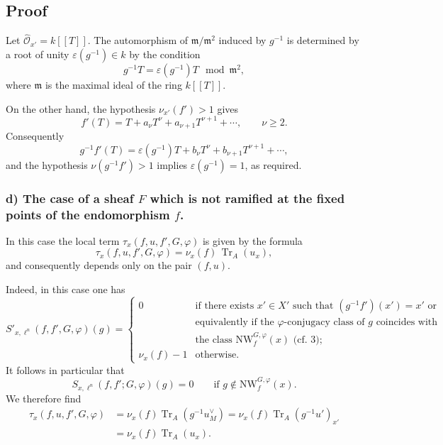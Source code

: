 \documentclass[11pt]{article}
\providecommand{\fm}{\mathfrak{m}}
\providecommand{\Tr}{\operatorname{Tr}}
\providecommand{\Tr}{\operatorname{Tr}}
\providecommand{\Tr}{\operatorname{Tr}}
\providecommand{\Tr}{\operatorname{Tr}}
\providecommand{\fm}{\mathfrak m}
\providecommand{\Tr}{\operatorname{Tr}}
\begin{document}
\subsection*{Proof}
Let $\widehat{\mathcal O}_{x'}=k[[T]]$. The automorphism of $\fm/\fm^2$ induced by $g^{-1}$ is determined by a root of unity $\varepsilon(g^{-1})\in k$ by the condition
\[
g^{-1}T=\varepsilon(g^{-1})T\mod \fm^2,
\]
where $\fm$ is the maximal ideal of the ring $k[[T]]$.

On the other hand, the hypothesis $\nu_{x'}(f')>1$ gives
\[
f'(T)=T+a_\nu T^\nu+a_{\nu+1}T^{\nu+1}+\cdots,
\qquad \nu\ge2.
\]
Consequently
\[
g^{-1}f'(T)=\varepsilon(g^{-1})T+b_\nu T^\nu+b_{\nu+1}T^{\nu+1}+\cdots,
\]
and the hypothesis $\nu(g^{-1}f')>1$ implies $\varepsilon(g^{-1})=1$, as required.

\subsubsection*{d) The case of a sheaf $F$ which is not ramified at the fixed points of the endomorphism $f$.}
In this case the local term $\tau_x(f,u,f',G,\varphi)$ is given by the formula
\begin{equation}\tag{6.4.6}\label{sga5:XII:equation:6.4.6}
\tau_x(f,u,f',G,\varphi)=\nu_x(f)\,\Tr_A(u_x),
\end{equation}
and consequently depends only on the pair $(f,u)$.

Indeed, in this case one has
\begin{equation}\tag{6.4.7}\label{sga5:XII:equation:6.4.7}
S'_{x,\ell^n}(f,f',G,\varphi)(g)=
\begin{cases}
0&\text{if there exists }x'\in X'\text{ such that }(g^{-1}f')(x')=x'\text{ or}\\
&\text{equivalently if the $\varphi$-conjugacy class of $g$ coincides with}\\
&\text{the class }\mathrm{NW}_{f}^{G,\varphi}(x)\text{ (cf. 3); }\\
\nu_x(f)-1&\text{otherwise.}
\end{cases}
\end{equation}
It follows in particular that
\begin{equation}\tag{6.4.8}\label{sga5:XII:equation:6.4.8}
S_{x,\ell^n}(f,f';G,\varphi)(g)=0
\qquad \text{if } g\notin \mathrm{NW}_{f}^{G,\varphi}(x).
\end{equation}
We therefore find
\begin{equation}\tag{6.4.9}\label{sga5:XII:equation:6.4.9}
\begin{aligned}
\tau_x(f,u,f',G,\varphi)
&=\nu_x(f)\Tr_A(g^{-1}u_M^\vee)
=\nu_x(f)\Tr_A(g^{-1}u')_{x'}\\
&=\nu_x(f)\Tr_A(u_x).
\end{aligned}
\end{equation}
\end{document}
